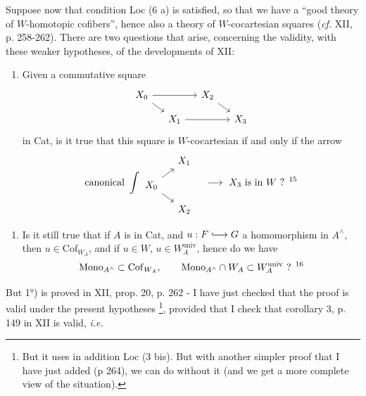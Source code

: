 \documentclass[11pt]{article}
\newcommand{\msp}[1]{\marginpar{\footnotesize [#1]}}
\newcommand{\Cof}{\mathrm{Cof}}
\newcommand{\Mono}{\mathrm{Mono}}
\newcommand{\univ}{\mathrm{univ}}
\begin{document}
Suppose now that condition Loc (6 a) is satisfied, so that we have a ``good theory of $W$-homotopic cofibers'', hence also a theory of $W$-cocartesian squares (\textit{cf.} XII, p. 258-262). There are two questions that arise, concerning the validity, with these weaker hypotheses, of the developments of XII:
\begin{enumerate}
\item[1°)] Given a commutative square
\[
\begin{tikzcd}[ampersand replacement=\&, row sep=small, column sep=small]
X_0 \arrow[rr] \arrow[dr] \& \& X_2 \arrow[dr] \& \\
\& X_1 \arrow[rr] \& \& X_3
\end{tikzcd}
\]
in Cat, is it true that this square is $W$-cocartesian if and only if the arrow
\[
\text{canonical}\ \displaystyle\int
\begin{tikzcd}[ampersand replacement=\&, row sep=small, column sep=small]
\& X_1 \\
X_0 \arrow[ur] \arrow[dr] \& \\
\& X_2
\end{tikzcd}
\quad \longrightarrow \ X_3 \text{ is in } W \text{ ? }\text{\footnotemark[15]}
\]
\end{enumerate}
\msp{page 24}
\begin{enumerate}
\item[2°)] Is it still true that if $A$ is in Cat, and $u : F \lhook\joinrel\longrightarrow G$ a homomorphism in $A^{\wedge}$, then $u \in \Cof_{W_A}$, and if $u \in W$, $u \in W_A^{\univ}$, hence do we have
\[
\Mono_{A^{\wedge}} \subset \Cof_{W_A}, \qquad \Mono_{A^{\wedge}} \cap W_A \subset W_A^{\univ} \text{ ? }\text{\footnotemark[16]}
\]
\end{enumerate}
But 1°) is proved in XII, prop. 20, p. 262 - I have just checked that the proof is valid under the present hypotheses \footnote[17]{But it uses in addition Loc (3 bis). But with another simpler proof that I have just added (p 264), we can do without it (and we get a more complete view of the situation).}, provided that I check that corollary 3, p. 149 in XII is valid, \textit{i.e.} %
\end{document}
